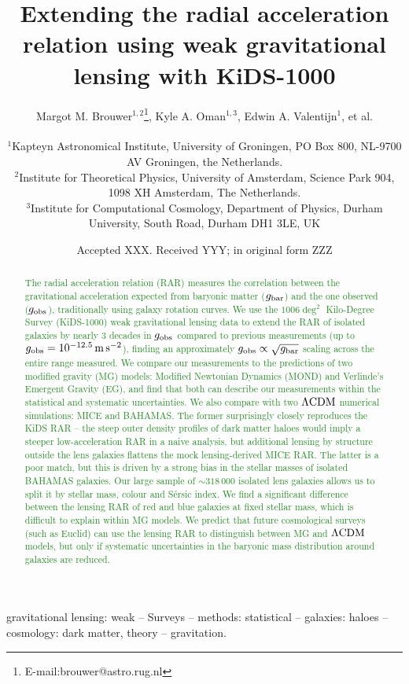\documentclass[usenatbib]{mnras}
\title[Extending the RAR using weak lensing with KiDS-1000]{Extending the radial acceleration relation using weak gravitational lensing with KiDS-1000}
\author[M. M. Brouwer et al.]{Margot M. Brouwer$^{1,2}$\thanks{E-mail:brouwer@astro.rug.nl}, Kyle A. Oman$^{1,3}$, Edwin A. Valentijn$^{1}$, et al.
	\\
	\\
	$^{1}$Kapteyn Astronomical Institute, University of Groningen, PO Box 800, NL-9700 AV Groningen, the Netherlands.\\
	$^{2}$Institute for Theoretical Physics, University of Amsterdam, Science Park 904, 1098 XH Amsterdam, The Netherlands. \\
    $^{3}$Institute for Computational Cosmology, Department of Physics, Durham University, South Road, Durham DH1 3LE, UK \\
}
\date{Accepted XXX. Received YYY; in original form ZZZ}
\newcommand{\lcdm}{{\rm \Lambda CDM}}
\newcommand{\un}[1]{_{\rm #1}}
\begin{document}
\label{firstpage}
\pagerange{\pageref{firstpage}--\pageref{lastpage}}
\maketitle

\begin{abstract}
  \textcolor{ForestGreen}{The radial acceleration relation (RAR) measures the correlation between the gravitational acceleration expected from baryonic matter ($g\un{bar}$) and the one observed ($g\un{obs}$), traditionally using galaxy rotation curves. We use the $1006 \deg^2$ Kilo-Degree Survey (KiDS-1000) weak gravitational lensing data to extend the RAR of isolated galaxies by nearly $3$ decades in $g_{\rm obs}$ compared to previous measurements (up to $g\un{obs}=10^{-12.5}\,{\rm m}\,{\rm s}^{-2}$), finding an approximately $g\un{obs}\propto\sqrt{g\un{bar}}$ scaling across the entire range measured. We compare our measurements to the predictions of two modified gravity (MG) models: Modified Newtonian Dynamics (MOND) and Verlinde's Emergent Gravity (EG), and find that both can describe our measurements within the statistical and systematic uncertainties. We also compare with two $\lcdm$ numerical simulations: MICE and BAHAMAS. The former surprisingly closely reproduces the KiDS RAR -- the steep outer density profiles of dark matter haloes would imply a steeper low-acceleration RAR in a naive analysis, but additional lensing by structure outside the lens galaxies flattens the mock lensing-derived MICE RAR. The latter is a poor match, but this is driven by a strong bias in the stellar masses of isolated BAHAMAS galaxies. Our large sample of $\sim318\,000$ isolated lens galaxies allows us to split it by stellar mass, colour and S\'ersic index. We find a significant difference between the lensing RAR of red and blue galaxies at fixed stellar mass, which is difficult to explain within MG models. We predict that future cosmological surveys (such as Euclid) can use the lensing RAR to distinguish between MG and $\lcdm$ models, but only if systematic uncertainties in the baryonic mass distribution around galaxies are reduced.}
\end{abstract}


\begin{keywords}
gravitational lensing: weak -- Surveys -- methods: statistical -- galaxies: haloes -- cosmology: dark matter, theory -- gravitation.
\\
\end{keywords}
\end{document}
